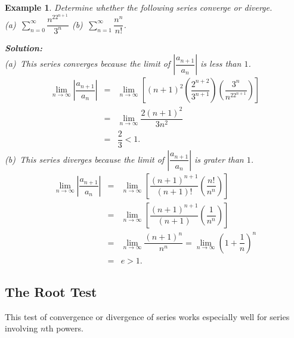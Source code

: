 \documentclass[titlepage,a4paper,12pt]{report}
\newtheorem{example}{Example}[section]
\begin{document}
\begin{example}
Determine whether the following series converge or diverge.\\
(a)\, $\displaystyle \sum _{n=0}^\infty \dfrac{n^22^{n+1}}{3^n}$ \quad (b)\, $\displaystyle \sum _{n=1}^\infty \dfrac{n^n}{ n!}$.

\noindent \textbf{Solution:} \\
(a)\, This series converges because the limit of $\left|\dfrac{a_{n+1}}{a_n}\right|$ is less than $1$.
\begin{eqnarray*}
\lim _{n\rightarrow \infty} \left|\dfrac{a_{n+1}}{a_n}\right| &=& \lim _{n\rightarrow \infty} \left[ (n+1)^2\left(\dfrac{2^{n+2}}{3^{n+1}}\right)\left(\dfrac{3^n}{n^22^{n+1}}\right)\right] \\
&=& \lim _{n\rightarrow \infty} \dfrac{2(n+1)^2}{3n^2}\\
&=& \dfrac{2}{3} <1.
\end{eqnarray*}
\noindent (b)\, This series diverges because the limit of $\left|\dfrac{a_{n+1}}{a_n}\right|$ is grater than $1$.
\begin{eqnarray*}
\lim _{n\rightarrow \infty} \left|\dfrac{a_{n+1}}{a_n}\right| &=& \lim _{n\rightarrow \infty}\left[\dfrac{(n+1)^{n+1}}{(n+1)!}\left(\dfrac{n!}{n^n}\right)\right] \\
&=& \lim _{n\rightarrow \infty} \left[\dfrac{(n+1)^{n+1}}{(n+1)}\left(\dfrac{1}{n^n}\right)\right]\\
&=& \lim _{n\rightarrow \infty} \dfrac{(n+1)^n}{n^n} =\lim _{n\rightarrow \infty} \left(1+\dfrac{1}{n}\right)^n\\
&=& e >1. 
\end{eqnarray*}
\end{example}
\subsection{The Root Test}
This test of convergence or divergence of series works especially well for series involving $n$th powers.
\end{document}
